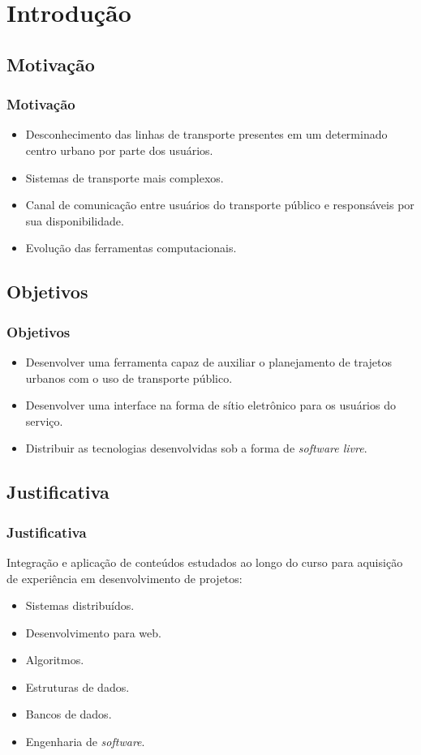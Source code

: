 \section{Introdução}
\subsection{Motivação}

\frame
{
\frametitle{Motivação}
\begin{itemize}
\item Desconhecimento das linhas de transporte presentes em um determinado centro urbano por parte dos usuários.
\item Sistemas de transporte mais complexos.
\item Canal de comunicação entre usuários do transporte público e responsáveis por sua disponibilidade.
\item Evolução das ferramentas computacionais.
\end{itemize}
}

\subsection{Objetivos}
\frame
{
\frametitle{Objetivos}
	
\begin{itemize}
\item Desenvolver uma ferramenta capaz de auxiliar o planejamento de trajetos urbanos com o uso de transporte público.
\item Desenvolver uma interface na forma de sítio eletrônico para os usuários do serviço.
\item Distribuir as tecnologias desenvolvidas sob a forma de \emph{software livre}.
\end{itemize}
}

\subsection{Justificativa}
\frame
{
\frametitle{Justificativa}
Integração e aplicação de conteúdos estudados ao longo do curso para aquisição de experiência em desenvolvimento de projetos:
\begin{itemize}
	\item Sistemas distribuídos.
	\item Desenvolvimento para web.
	\item Algoritmos.
	\item Estruturas de dados.
	\item Bancos de dados.
	\item Engenharia de \emph{software}.
\end{itemize}



}
